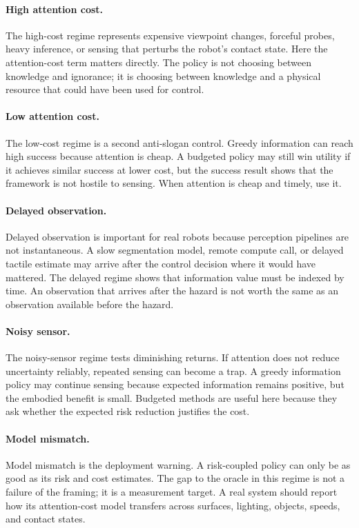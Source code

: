 \documentclass{article}
\begin{document}
\paragraph{High attention cost.}
The high-cost regime represents expensive viewpoint changes, forceful probes,
heavy inference, or sensing that perturbs the robot's contact state. Here the
attention-cost term matters directly. The policy is not choosing between
knowledge and ignorance; it is choosing between knowledge and a physical
resource that could have been used for control.

\paragraph{Low attention cost.}
The low-cost regime is a second anti-slogan control. Greedy information can
reach high success because attention is cheap. A budgeted policy may still win
utility if it achieves similar success at lower cost, but the success result
shows that the framework is not hostile to sensing. When attention is cheap
and timely, use it.

\paragraph{Delayed observation.}
Delayed observation is important for real robots because perception pipelines
are not instantaneous. A slow segmentation model, remote compute call, or
delayed tactile estimate may arrive after the control decision where it would
have mattered. The delayed regime shows that information value must be indexed
by time. An observation that arrives after the hazard is not worth the same as
an observation available before the hazard.

\paragraph{Noisy sensor.}
The noisy-sensor regime tests diminishing returns. If attention does not
reduce uncertainty reliably, repeated sensing can become a trap. A greedy
information policy may continue sensing because expected information remains
positive, but the embodied benefit is small. Budgeted methods are useful here
because they ask whether the expected risk reduction justifies the cost.

\paragraph{Model mismatch.}
Model mismatch is the deployment warning. A risk-coupled policy can only be as
good as its risk and cost estimates. The gap to the oracle in this regime is
not a failure of the framing; it is a measurement target. A real system should
report how its attention-cost model transfers across surfaces, lighting,
objects, speeds, and contact states.
\end{document}
